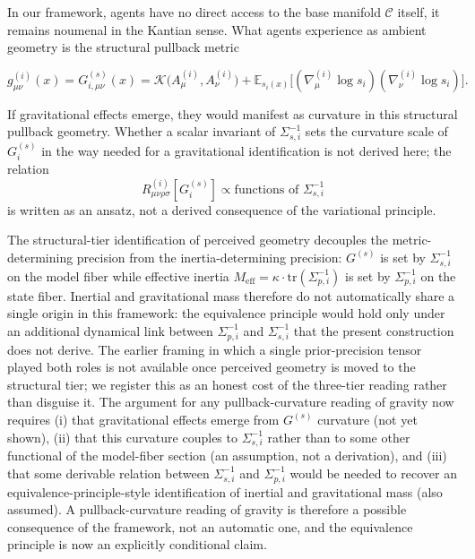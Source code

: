 \documentclass[11pt]{article}
\begin{document}
In our framework, agents have no direct access to the base manifold $\mathcal{C}$ itself, it remains noumenal in the Kantian sense. What agents experience as ambient geometry is the structural pullback metric

\begin{equation}
g_{\mu\nu}^{(i)}(x) = G^{(s)}_{i,\mu\nu}(x) = \mathcal{K}\big(A^{(i)}_\mu, A^{(i)}_\nu\big) + \mathbb{E}_{s_i(x)}\big[(\nabla^{(i)}_\mu \log s_i)(\nabla^{(i)}_\nu \log s_i)\big].
\end{equation}

If gravitational effects emerge, they would manifest as curvature in this structural pullback geometry. Whether a scalar invariant of $\Sigma_{s,i}^{-1}$ sets the curvature scale of $G^{(s)}_i$ in the way needed for a gravitational identification is not derived here; the relation
\begin{equation}
R_{\mu\nu\rho\sigma}^{(i)}[G^{(s)}_i] \propto \text{functions of } \Sigma_{s,i}^{-1}
\end{equation}
is written as an ansatz, not a derived consequence of the variational principle.

The structural-tier identification of perceived geometry decouples the metric-determining precision from the inertia-determining precision: $G^{(s)}$ is set by $\Sigma_{s,i}^{-1}$ on the model fiber while effective inertia $M_{\text{eff}} = \kappa \cdot \mathrm{tr}(\Sigma_{p,i}^{-1})$ is set by $\Sigma_{p,i}^{-1}$ on the state fiber. Inertial and gravitational mass therefore do not automatically share a single origin in this framework: the equivalence principle would hold only under an additional dynamical link between $\Sigma_{p,i}^{-1}$ and $\Sigma_{s,i}^{-1}$ that the present construction does not derive. The earlier framing in which a single prior-precision tensor played both roles is not available once perceived geometry is moved to the structural tier; we register this as an honest cost of the three-tier reading rather than disguise it. The argument for any pullback-curvature reading of gravity now requires (i) that gravitational effects emerge from $G^{(s)}$ curvature (not yet shown), (ii) that this curvature couples to $\Sigma_{s,i}^{-1}$ rather than to some other functional of the model-fiber section (an assumption, not a derivation), and (iii) that some derivable relation between $\Sigma_{s,i}^{-1}$ and $\Sigma_{p,i}^{-1}$ would be needed to recover an equivalence-principle-style identification of inertial and gravitational mass (also assumed). A pullback-curvature reading of gravity is therefore a possible consequence of the framework, not an automatic one, and the equivalence principle is now an explicitly conditional claim.
\end{document}
